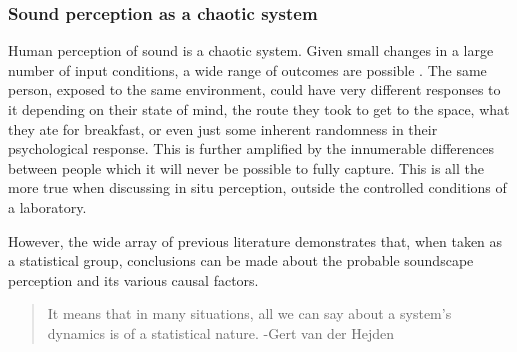 
\subsubsection{Sound perception as a chaotic system}

Human perception of sound is a chaotic system. Given small changes in a large number of input conditions, a wide range of outcomes are possible . The same person, exposed to the same environment, could have very different responses to it depending on their state of mind, the route they took to get to the space, what they ate for breakfast, or even just some inherent randomness in their psychological response. This is further amplified by the innumerable differences between people which it will never be possible to fully capture. This is all the more true when discussing in situ perception, outside the controlled conditions of a laboratory.

However, the wide array of previous literature demonstrates that, when taken as a statistical group, conclusions can be made about the probable soundscape perception and its various causal factors.

\begin{quote}
  It means that in many situations, all we can say about a system's dynamics is of a statistical nature. -Gert van der Hejden
\end{quote}